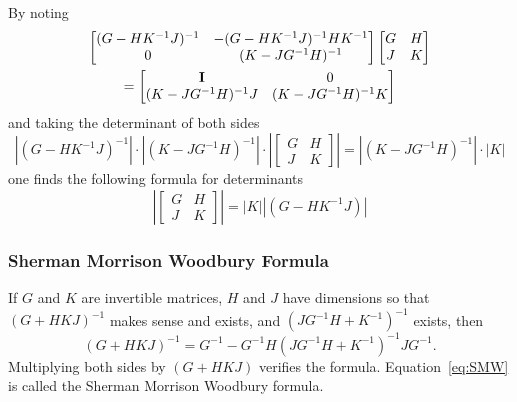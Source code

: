 By noting
\begin{multline*}
  \begin{bmatrix}
    (G-HK^{-1}J)^{-1} & -(G-HK^{-1}J)^{-1}HK^{-1} \\
    0 & (K-JG^{-1}H)^{-1}
  \end{bmatrix}
  \begin{bmatrix}
    G & H \\ J & K
  \end{bmatrix}\\
  =
  \begin{bmatrix}
    {\bf I} & 0 \\
     (K-JG^{-1}H)^{-1}J & (K-JG^{-1}H)^{-1} K
  \end{bmatrix}
\end{multline*}
and taking the determinant of both sides
\renewcommand{\det}[1]{\left| #1 \right|}
\begin{equation*}
  \det{(G-HK^{-1}J)^{-1}} \cdot \det{(K-JG^{-1}H)^{-1}} \cdot 
  \det{\begin{bmatrix}
    G & H \\ J & K
  \end{bmatrix}} = \det{(K-JG^{-1}H)^{-1}} \cdot \det {K}
\end{equation*}
one finds the following formula for determinants
\begin{equation}
  \label{eq:BlockDet}
  \det{ \begin{bmatrix} G & H \\ J & K \end{bmatrix}} = \det{K}
  \det{(G-HK^{-1}J)}
\end{equation}
\subsubsection{Sherman Morrison Woodbury Formula}

If $G$ and $ K $ are invertible matrices, $H$ and $ J $ have
dimensions so that $\left( G + H K J \right)^{-1}$ makes sense and
exists, and $\left( J G^{-1}H + K ^{-1} \right)^{-1}$ exists, then
\begin{equation}
  \label{eq:SMW}
  \left( G + H K  J  \right)^{-1} = G^{-1} - G^{-1}H\left( J G^{-1}H +
   K ^{-1}\right)^{-1} J G^{-1}.
\end{equation}
Multiplying both sides by $\left( G + H K  J  \right)$ verifies the
formula.  Equation~\eqref{eq:SMW} is called the Sherman Morrison
Woodbury formula.

